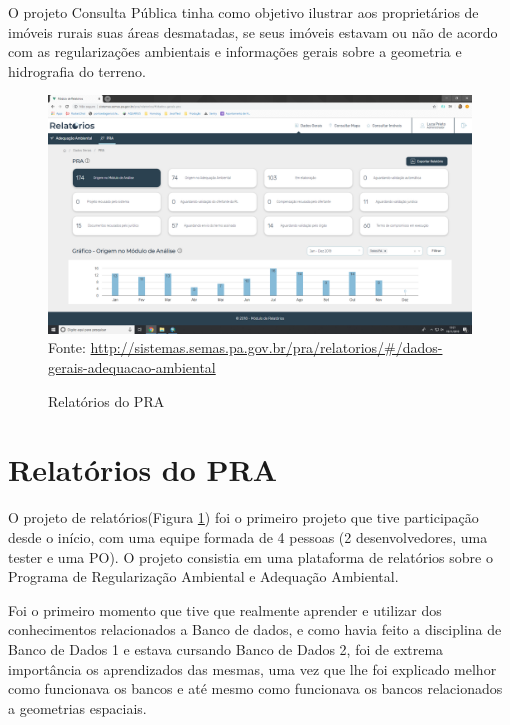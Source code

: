 O projeto Consulta Pública tinha como objetivo ilustrar aos proprietários de imóveis rurais suas áreas desmatadas, se seus imóveis estavam ou não de acordo com as regularizações ambientais e informações gerais sobre a geometria e hidrografia do terreno.

\begin{figure}[H]
\centering
\caption{Relatórios do PRA} %
\includegraphics[scale=0.22]{relatorios-pra}\\  %
{\small Fonte: \url{http://sistemas.semas.pa.gov.br/pra/relatorios/#/dados-gerais-adequacao-ambiental}} %
\label{fig:relatorios} %
\end{figure}

\section{Relatórios do PRA}
O projeto de relatórios(Figura \ref{fig:relatorios}) foi o primeiro projeto que tive participação desde o início, com uma equipe formada de 4 pessoas (2 desenvolvedores, uma tester e uma PO).
O projeto consistia em uma plataforma de relatórios sobre o Programa de Regularização Ambiental e Adequação Ambiental.

Foi o primeiro momento que tive que realmente aprender e utilizar dos conhecimentos relacionados a Banco de dados, e como havia feito a disciplina de Banco de Dados 1 e estava cursando Banco de Dados 2, foi de extrema importância os aprendizados das mesmas,
uma vez que lhe foi explicado melhor como funcionava os bancos e até mesmo como funcionava os bancos relacionados a geometrias espaciais.

